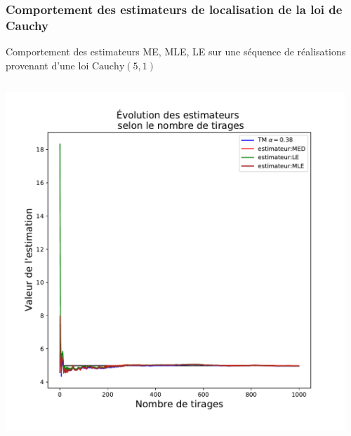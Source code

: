 \documentclass[8pt,sans,aspectratio=169]{beamer}
\begin{document}
\begin{frame}

\frametitle{Comportement des estimateurs de localisation de la loi de Cauchy }
Comportement des estimateurs ME, MLE, LE sur une séquence de réalisations provenant d'une loi $\mathrm{Cauchy}(5,1)$

\pause

\begin{columns}[T] %

\begin{column}{0.5\linewidth}

\includegraphics[scale=0.3]{Est-1000.pdf}

\end{column}

\pause
\hfill

\begin{column}{0.5\linewidth}


\end{column}
\end{columns}
\end{frame}
\end{document}
